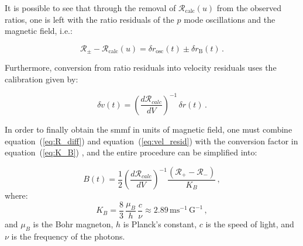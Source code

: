 It is possible to see that through the removal of $\mathcal{R}_{\mathrm{calc}}(u)$ from the observed ratios, one is left with the ratio residuals of the $p$ mode oscillations and the magnetic field, i.e.:

\begin{equation}
\mathcal{R}_{\pm} - \mathcal{R}_{\mathrm{calc}}(u) = \delta {r}_{\mathrm{osc}}(t) \pm \delta {r}_{\mathrm{B}}(t)
\label{eq:ratio_resid} \, .
\end{equation}

Furthermore, conversion from ratio residuals into velocity residuals uses the calibration given by:


\begin{equation}
\delta v(t) = \left( \frac{d\mathcal{R}_{calc}}{dV} \right)^{-1} \, \delta {r}(t) \, .
\label{eq:vel_resid}
\end{equation}

In order to finally obtain the \gls{smmf} in units of magnetic field, one must combine equation~(\ref{eq:R_diff}) and  equation~(\ref{eq:vel_resid}) with the conversion factor in equation~(\ref{eq:K_B}) \citep{dumbill_observation_1999}, and the entire procedure can be simplified into:

\begin{equation}
B(t) = \frac{1}{2} \left( \frac{d\mathcal{R}_{calc}}{dV} \right)^{-1} \frac{(\mathcal{R}_{+} - \mathcal{R}_{-})}{K_B} \, ,
\label{eq:simplified_SMMF_cal}
\end{equation}
%
where:
%
\begin{equation}
K_B = \frac{8}{3} \, \frac{\mu_B}{h} \, \frac{c}{\nu} \approx 2.89 \, \mathrm{ms}^{-1} \, \mathrm{G}^{-1} \, ,
\label{eq:K_B}
\end{equation}
%
and $\mu_B$ is the Bohr magneton, $h$ is Planck's constant, $c$ is the speed of light, and $\nu$ is the frequency of the photons.

